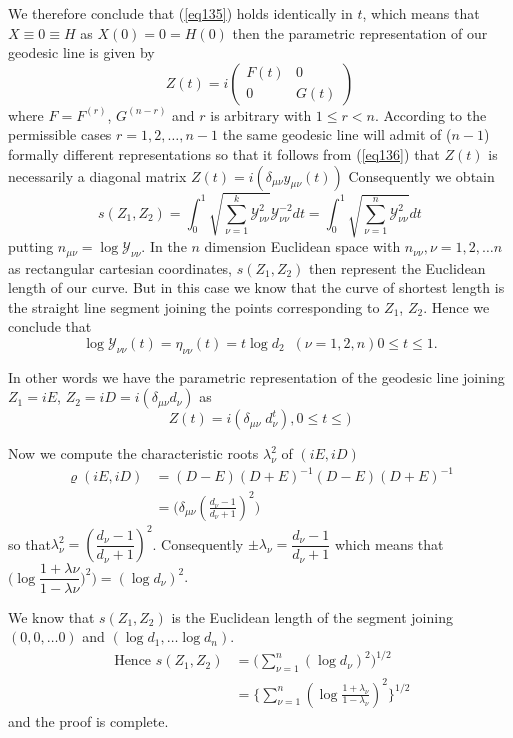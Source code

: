  We therefore conclude that (\ref{eq135}) holds identically in $t$,
 which means  that\pageoriginale  $X \equiv 0 \equiv H$ as $ X(0) = 0 =
 H(0)$ then the parametric representation of our geodesic line is
 given by 
 \begin{equation*}
Z(t) =  i \begin{pmatrix} F(t) &  0 \\  0 &  G(t) \end{pmatrix}
\tag{136}\label{eq136} 
 \end{equation*} 
 where $F=F^{(r)}$, $G^{(n -r)}$ and $r$ is arbitrary with $1 \le r <
 n$. According to the permissible cases $r = 1, 2,\ldots, n-1$ the same
 geodesic line will admit of ($n-1$) formally different
 representations so that it follows from (\ref{eq136}) that $Z(t)$ is
 necessarily a diagonal matrix $Z(t) = i (\delta_{\mu\nu} y_{\mu\nu}
 (t))$ Consequently we obtain  
 $$
 s(Z_1 , Z_2) = \int^1_0  \sqrt{\sum^k_{\nu = 1}
   \mathscr{Y}^2_{\nu \nu}}\mathscr{Y}^{-2}_{\nu \nu} dt = \int^1_0
 \sqrt{\sum^n_{\nu = 1} \mathscr{Y}^{2}_{\nu \nu}} dt 
 $$
 putting $n_{\mu \nu} = \log \mathscr{Y}_{\nu \nu}$. In the $n$
 dimension Euclidean space with $n_{\nu \nu}, \nu = 1,2, \ldots n$
 as rectangular cartesian coordinates, $s(Z_1 , Z_2)$ then
 represent the Euclidean length of our curve. But in this case we know
 that the curve of shortest length is the straight line segment
 joining the points corresponding to $Z_1$, $Z_2$. Hence we conclude
 that  
 $$
 \log \mathscr{Y}_{\nu \nu}(t) = \eta_{\nu \nu} (t) = t \log d_2 \; \;
 (\nu = 1,2, n) 0 \le t \le 1. 
 $$
 
 In other words we have the parametric representation of the geodesic
 line joining $Z_1 = i E$, $Z_2 = iD = i(\delta_{\mu \nu}
 d_\nu)$  
  as
 $$
 Z(t) = i (\delta_{\mu \nu} \; d^t_\nu) , 0\le t \le ) 
 $$
 
 Now we compute the characteristic roots $\lambda^2_\nu$ of $(iE, iD)$ 
 \begin{align*}
\varrho (i E , iD)  & =(D - E)(D + E)^{-1} (D - E)(D +
E)^{-1 } \\ 
& = \big(\delta_{\mu \nu} (\frac{d_\nu -1}{d_\nu +1})^2 \big)
 \end{align*} 
 so that\pageoriginale  $\lambda^2_\nu = (\dfrac{d_\nu -1}{d_\nu
   +1})^2$. Consequently 
 $\pm \lambda_\nu = \dfrac{d_\nu -1}{d_\nu +1}$ which means that
 $\big( \log \dfrac{1 +\lambda \nu}{1-\lambda \nu})^2 \big) = (\log d_\nu)^2$. 
 
 We know that $s(Z_1 ,Z_2)$ is the Euclidean length of the
 segment joining $(0,0,\ldots 0)$ and $(\log d_1, \ldots \log d_n)$. 
 \begin{align*}
\text{ Hence } s (Z_1 , Z_2) & =\bigg ( \sum^n_{\nu =
  1}(\log d_\nu)^2 \bigg) ^{1/2}\\ 
& = \bigg\{ \sum^n_{\nu = 1}(\log  \frac{1 + \lambda_\nu}{1 -
  \lambda_\nu} )^2 \bigg\} ^{1/2} 
 \end{align*} 
 and the proof is complete.
 
